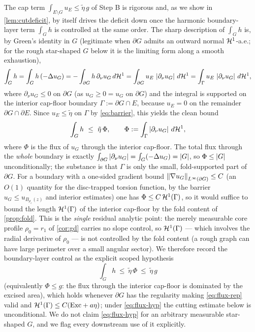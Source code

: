 \begin{remark}
\label{gap:torsion-stab}
The cap term $\int_{E\setminus G}u_E\le\tilde\eta\,g$ of Step B is rigorous
and, as we show in \cref{lem:cutdeficit}, by itself drives the deficit down
once the harmonic boundary-layer term $\int_G h$ is controlled at the same
order. The sharp description of $\int_G h$ is, by Green's identity in $G$
\textup(legitimate when $\partial G$ admits an outward normal $\mathcal{H}^1$-a.e.;
for the rough star-shaped $G$ below it is the limiting form along a smooth
exhaustion\textup),
\begin{equation}\label{eq:flux-rep}
   \int_G h=\int_G h\,(-\Delta u_G)
   =-\int_{\partial G}h\,\partial_\nu u_G\,d\mathcal{H}^1
   =\int_{\partial G}u_E\,\left\lvert\partial_\nu u_G\right\rvert\,d\mathcal{H}^1
   =\int_\Gamma u_E\,\left\lvert\partial_\nu u_G\right\rvert\,d\mathcal{H}^1,
\end{equation}
where $\partial_\nu u_G\le0$ on $\partial G$ \textup(as $u_G\ge0=u_G$ on
$\partial G$\textup) and the integral is supported on the interior cap-floor
boundary $\Gamma:=\partial G\cap E$, because $u_E=0$ on the remainder
$\partial G\cap\partial E$. Since $u_E\le\tilde\eta$ on $\Gamma$ by
\eqref{eq:barrier}, this yields the clean bound
\begin{equation}\label{eq:flux-bound}
   \int_G h\ \le\ \tilde\eta\,\Phi,
   \qquad
   \Phi:=\int_\Gamma\left\lvert\partial_\nu u_G\right\rvert\,d\mathcal{H}^1,
\end{equation}
where $\Phi$ is the flux of $u_G$ through the interior cap-floor. The total
flux through the \emph{whole} boundary is exactly $\int_{\partial
G}\left\lvert\partial_\nu u_G\right\rvert=\int_G(-\Delta u_G)=\left\lvert G\right\rvert$, so $\Phi\le\left\lvert G\right\rvert$
unconditionally; the substance is that $\Gamma$ is only the small,
fold-supported part of $\partial G$. For a boundary with a one-sided gradient
bound $\left\lVert\nabla u_G\right\rVert_{L^\infty(\partial G)}\le C$ \textup(an $O(1)$
quantity for the disc-trapped torsion function, by the barrier $u_G\le
u_{B_{\rho_e}(z)}$ and interior estimates\textup) one has $\Phi\le
C\,\mathcal{H}^1(\Gamma)$, so it would suffice to bound the length $\mathcal{H}^1(\Gamma)$ of
the interior cap-floor by the fold content of \cref{prop:fold}. This is the
\emph{single} residual analytic point: the merely measurable core profile
$\rho_0=r_1$ of \cref{cor:gd} carries no slope control, so $\mathcal{H}^1(\Gamma)$
--- which involves the radial derivative of $\rho_0$ --- is not controlled by
the fold content (a rough graph can have large perimeter over a small angular
sector). We therefore record the boundary-layer control as the explicit
scoped hypothesis
\begin{equation}\label{eq:flux-hyp}
   \int_G h\ \le\ \tilde\eta\,\Phi\ \le\ \tilde\eta\,g
\end{equation}
\textup(equivalently $\Phi\le g$: the flux through the interior cap-floor is
dominated by the excised area\textup), which holds whenever $\partial G$ has
the regularity making \eqref{eq:flux-rep} valid and $\mathcal{H}^1(\Gamma)\le
C(\mathrm{Exc}+a\eta)$; under \eqref{eq:flux-hyp} the cutting estimate below is
unconditional. We do not claim \eqref{eq:flux-hyp} for an arbitrary
measurable star-shaped $G$, and we flag every downstream use of it
explicitly.
\end{remark}

